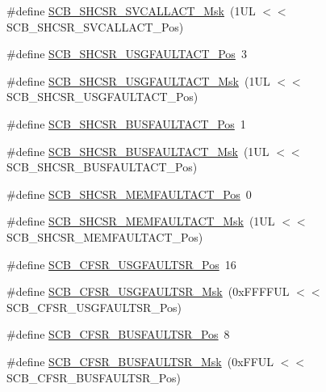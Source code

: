 \begin{DoxyCompactItemize}
\#define \hyperlink{group___c_m_s_i_s___s_c_b_ga634c0f69a233475289023ae5cb158fdf}{S\-C\-B\-\_\-\-S\-H\-C\-S\-R\-\_\-\-S\-V\-C\-A\-L\-L\-A\-C\-T\-\_\-\-Msk}~(1\-U\-L $<$$<$ S\-C\-B\-\_\-\-S\-H\-C\-S\-R\-\_\-\-S\-V\-C\-A\-L\-L\-A\-C\-T\-\_\-\-Pos)
\item 
\#define \hyperlink{group___c_m_s_i_s___s_c_b_gae06f54f5081f01ed3f6824e451ad3656}{S\-C\-B\-\_\-\-S\-H\-C\-S\-R\-\_\-\-U\-S\-G\-F\-A\-U\-L\-T\-A\-C\-T\-\_\-\-Pos}~3
\item 
\#define \hyperlink{group___c_m_s_i_s___s_c_b_gab3166103b5a5f7931d0df90949c47dfe}{S\-C\-B\-\_\-\-S\-H\-C\-S\-R\-\_\-\-U\-S\-G\-F\-A\-U\-L\-T\-A\-C\-T\-\_\-\-Msk}~(1\-U\-L $<$$<$ S\-C\-B\-\_\-\-S\-H\-C\-S\-R\-\_\-\-U\-S\-G\-F\-A\-U\-L\-T\-A\-C\-T\-\_\-\-Pos)
\item 
\#define \hyperlink{group___c_m_s_i_s___s_c_b_gaf272760f2df9ecdd8a5fbbd65c0b767a}{S\-C\-B\-\_\-\-S\-H\-C\-S\-R\-\_\-\-B\-U\-S\-F\-A\-U\-L\-T\-A\-C\-T\-\_\-\-Pos}~1
\item 
\#define \hyperlink{group___c_m_s_i_s___s_c_b_ga9d7a8b1054b655ad08d85c3c535d4f73}{S\-C\-B\-\_\-\-S\-H\-C\-S\-R\-\_\-\-B\-U\-S\-F\-A\-U\-L\-T\-A\-C\-T\-\_\-\-Msk}~(1\-U\-L $<$$<$ S\-C\-B\-\_\-\-S\-H\-C\-S\-R\-\_\-\-B\-U\-S\-F\-A\-U\-L\-T\-A\-C\-T\-\_\-\-Pos)
\item 
\#define \hyperlink{group___c_m_s_i_s___s_c_b_ga7c856f79a75dcc1d1517b19a67691803}{S\-C\-B\-\_\-\-S\-H\-C\-S\-R\-\_\-\-M\-E\-M\-F\-A\-U\-L\-T\-A\-C\-T\-\_\-\-Pos}~0
\item 
\#define \hyperlink{group___c_m_s_i_s___s_c_b_ga9147fd4e1b12394ae26eadf900a023a3}{S\-C\-B\-\_\-\-S\-H\-C\-S\-R\-\_\-\-M\-E\-M\-F\-A\-U\-L\-T\-A\-C\-T\-\_\-\-Msk}~(1\-U\-L $<$$<$ S\-C\-B\-\_\-\-S\-H\-C\-S\-R\-\_\-\-M\-E\-M\-F\-A\-U\-L\-T\-A\-C\-T\-\_\-\-Pos)
\item 
\#define \hyperlink{group___c_m_s_i_s___s_c_b_gac8e4197b295c8560e68e2d71285c7879}{S\-C\-B\-\_\-\-C\-F\-S\-R\-\_\-\-U\-S\-G\-F\-A\-U\-L\-T\-S\-R\-\_\-\-Pos}~16
\item 
\#define \hyperlink{group___c_m_s_i_s___s_c_b_ga565807b1a3f31891f1f967d0fa30d03f}{S\-C\-B\-\_\-\-C\-F\-S\-R\-\_\-\-U\-S\-G\-F\-A\-U\-L\-T\-S\-R\-\_\-\-Msk}~(0x\-F\-F\-F\-F\-U\-L $<$$<$ S\-C\-B\-\_\-\-C\-F\-S\-R\-\_\-\-U\-S\-G\-F\-A\-U\-L\-T\-S\-R\-\_\-\-Pos)
\item 
\#define \hyperlink{group___c_m_s_i_s___s_c_b_ga555a24f4f57d199f91d1d1ab7c8c3c8a}{S\-C\-B\-\_\-\-C\-F\-S\-R\-\_\-\-B\-U\-S\-F\-A\-U\-L\-T\-S\-R\-\_\-\-Pos}~8
\item 
\#define \hyperlink{group___c_m_s_i_s___s_c_b_ga26dc1ddfdc37a6b92597a6f7e498c1d6}{S\-C\-B\-\_\-\-C\-F\-S\-R\-\_\-\-B\-U\-S\-F\-A\-U\-L\-T\-S\-R\-\_\-\-Msk}~(0x\-F\-F\-U\-L $<$$<$ S\-C\-B\-\_\-\-C\-F\-S\-R\-\_\-\-B\-U\-S\-F\-A\-U\-L\-T\-S\-R\-\_\-\-Pos)

\end{DoxyCompactItemize}
